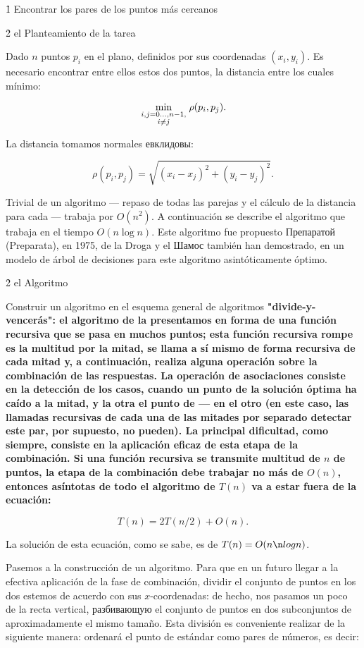 \h1{ Encontrar los pares de los puntos más cercanos }


\h2{ el Planteamiento de la tarea }

Dado $n$ puntos $p_i$ en el plano, definidos por sus coordenadas $(x_i,y_i)$. Es necesario encontrar entre ellos estos dos puntos, la distancia entre los cuales mínimo:

$$ \min_{\scriptstyle i,j=0 \ldots, n-1, \atop \scriptstyle i \ne j} \rho (p_i,p_j). $$

La distancia tomamos normales евклидовы:

$$ \rho(p_i,p_j) = \sqrt{ (x_i-x_j)^2 + (y_i-y_j)^2 }. $$

Trivial de un algoritmo --- repaso de todas las parejas y el cálculo de la distancia para cada --- trabaja por $O(n^2)$. A continuación se describe el algoritmo que trabaja en el tiempo $O(n \log n)$. Este algoritmo fue propuesto Препаратой (Preparata), en 1975, de la Droga y el Шамос también han demostrado, en un modelo de árbol de decisiones para este algoritmo asintóticamente óptimo.


\h2{ el Algoritmo }

Construir un algoritmo en el esquema general de algoritmos \bf{"divide-y-vencerás"}: el algoritmo de la presentamos en forma de una función recursiva que se pasa en muchos puntos; esta función recursiva rompe es la multitud por la mitad, se llama a sí mismo de forma recursiva de cada mitad y, a continuación, realiza alguna operación sobre la combinación de las respuestas. La operación de asociaciones consiste en la detección de los casos, cuando un punto de la solución óptima ha caído a la mitad, y la otra el punto de --- en el otro (en este caso, las llamadas recursivas de cada una de las mitades por separado detectar este par, por supuesto, no pueden). La principal dificultad, como siempre, consiste en la aplicación eficaz de esta etapa de la combinación. Si una función recursiva se transmite multitud de $n$ de puntos, la etapa de la combinación debe trabajar no más de $O(n)$, entonces asíntotas de todo el algoritmo de $T(n)$ va a estar fuera de la ecuación:

$$ T(n) = 2 T(n/2) + O(n). $$

La solución de esta ecuación, como se sabe, es de $T(n) = O (n \n log n)$.

Pasemos a la construcción de un algoritmo. Para que en un futuro llegar a la efectiva aplicación de la fase de combinación, dividir el conjunto de puntos en los dos estemos de acuerdo con sus $x$-coordenadas: de hecho, nos pasamos un poco de la recta vertical, разбивающую el conjunto de puntos en dos subconjuntos de aproximadamente el mismo tamaño. Esta división es conveniente realizar de la siguiente manera: ordenará el punto de estándar como pares de números, es decir:

